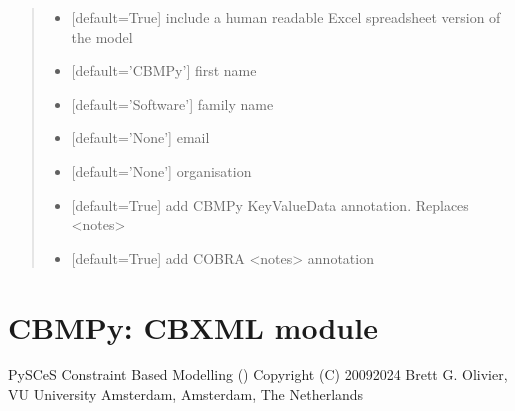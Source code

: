 \documentclass[letterpaper,12pt,english]{sphinxmanual}
\begin{document}
\begin{fulllineitems}
\begin{quote}
\begin{description}
\begin{itemize}
\item {} 
\sphinxAtStartPar
{} \textendash{} {[}default=True{]} include a human readable Excel spreadsheet version of the model

\item {} 
\sphinxAtStartPar
{} \textendash{} {[}default=’CBMPy’{]} first name

\item {} 
\sphinxAtStartPar
{} \textendash{} {[}default=’Software’{]} family name

\item {} 
\sphinxAtStartPar
{} \textendash{} {[}default=’None’{]} email

\item {} 
\sphinxAtStartPar
{} \textendash{} {[}default=’None’{]} organisation

\item {} 
\sphinxAtStartPar
{} \textendash{} {[}default=True{]} add CBMPy KeyValueData annotation. Replaces \textless{}notes\textgreater{}

\item {} 
\sphinxAtStartPar
{} \textendash{} {[}default=True{]} add COBRA \textless{}notes\textgreater{} annotation

\end{itemize}

\end{description}\end{quote}

\end{fulllineitems}


\section{CBMPy: CBXML module}
\label{\detokenize{api/io:cbmpy-cbxml-module}}\label{\detokenize{api/io:module-cbmpy.CBXML}}
\sphinxAtStartPar
PySCeS Constraint Based Modelling ()
Copyright (C) 2009\sphinxhyphen{}2024 Brett G. Olivier, VU University Amsterdam, Amsterdam, The Netherlands
\end{document}
